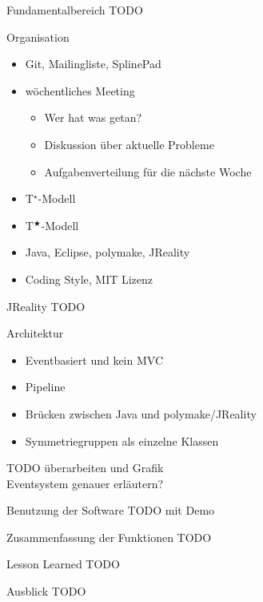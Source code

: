 \documentclass[ucs,11pt]{beamer}
\begin{document}
\begin{frame}{Fundamentalbereich}
TODO
\end{frame}

\begin{frame}{Organisation}
		\begin{itemize}
			\item Git, Mailingliste, SplinePad \pause
			\item wöchentliches Meeting \pause
				\begin{itemize}
					\item Wer hat was getan?
					\item Diskussion über aktuelle Probleme
					\item Aufgabenverteilung für die nächste Woche
				\end{itemize} \pause
			\item T$^\star$-Modell \pause
			\item T$^\bigstar$-Modell \pause
			\item Java, Eclipse, polymake, JReality \pause
			\item Coding Style, MIT Lizenz
		\end{itemize}
\end{frame}

\begin{frame}{JReality}
TODO
\end{frame}


\begin{frame}{Architektur}
	\begin{itemize}
		\item Eventbasiert und kein MVC \pause
		\item Pipeline \pause
		\item Brücken zwischen Java und polymake/JReality \pause
		\item Symmetriegruppen als einzelne Klassen
	\end{itemize}
TODO überarbeiten und Grafik \\
Eventsystem genauer erläutern?
\end{frame}

\begin{frame}{Benutzung der Software}
	TODO mit Demo
\end{frame}

\begin{frame}{Zusammenfassung der Funktionen}
TODO
\end{frame}

\begin{frame}{Lesson Learned}
TODO
\end{frame}

\begin{frame}{Ausblick}
TODO 
\end{frame}
\end{document}
